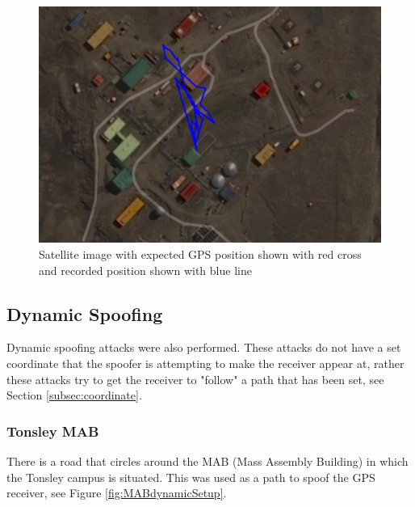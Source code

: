 \begin{figure}[H]
    \begin{centering}
        \includegraphics[width=12cm,keepaspectratio]{Figures/2021_3_30_static_antarctica_Satellite.PNG}
        \caption{Satellite image with expected GPS position shown with red cross and recorded position shown with blue line}
        \label{fig:antarcticaSatelliteImage}
    \end{centering}
\end{figure}

\subsection{Dynamic Spoofing}
Dynamic spoofing attacks were also performed. These attacks do not have a set coordinate that the spoofer is attempting to make the receiver appear at, rather these
attacks try to get the receiver to "follow" a path that has been set, see Section \ref{subsec:coordinate}.
\subsubsection{Tonsley MAB}
There is a road that circles around the MAB (Mass Assembly Building) in which the \univname Tonsley campus is situated. This was used as a path to spoof the GPS receiver,
see Figure \ref{fig:MABdynamicSetup}.

